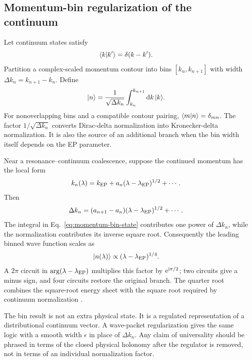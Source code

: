 \subsection{Momentum-bin regularization of the continuum}
\label{subsec:momentum-bin}

Let continuum states satisfy
\begin{equation}
  \langle k|k' \rangle=\delta(k-k') .
  \label{eq:continuum-normalization}
\end{equation}
Partition a complex-scaled momentum contour into bins
$[k_n,k_{n+1}]$ with width $\Delta k_n=k_{n+1}-k_n$.  Define
\begin{equation}
  \lvert n \rangle
  =\frac{1}{\sqrt{\Delta k_n}}
  \int_{k_n}^{k_{n+1}}\mathrm{d} k\,\lvert k \rangle .
  \label{eq:momentum-bin-state}
\end{equation}
For nonoverlapping bins and a compatible contour pairing,
$\langle m|n \rangle=\delta_{mn}$.  The factor
$1/\sqrt{\Delta k_n}$ converts Dirac-delta normalization into Kronecker-delta
normalization.  It is also the source of an additional branch when the bin
width itself depends on the EP parameter.

Near a resonance--continuum coalescence, suppose the continued momentum has
the local form
\begin{equation}
  k_n(\lambda)
  =k_{\mathrm{EP}}
  +a_n(\lambda-\lambda_{\mathrm{EP}})^{1/2}
  +\cdots .
  \label{eq:k-ep-puiseux}
\end{equation}
Then
\begin{equation}
  \Delta k_n
  =(a_{n+1}-a_n)
  (\lambda-\lambda_{\mathrm{EP}})^{1/2}
  +\cdots .
  \label{eq:bin-width-branch}
\end{equation}
The integral in Eq.~\eqref{eq:momentum-bin-state} contributes one power of
$\Delta k_n$, while the normalization contributes its inverse square root.
Consequently the leading binned wave function scales as
\begin{equation}
  \lvert n(\lambda) \rangle
  \propto(\lambda-\lambda_{\mathrm{EP}})^{1/4} .
  \label{eq:quarter-root-state}
\end{equation}
A $2\pi$ circuit in $\arg(\lambda-\lambda_{\mathrm{EP}})$ multiplies this
factor by $\mathrm{e}^{\mathrm{i}\pi/2}$; two circuits give a minus sign, and four circuits
restore the original branch.  The quarter root combines the square-root
energy sheet with the square root required by continuum normalization
\cite{Morikawa:2025inx}.

The bin result is not an extra physical state.  It is a regulated
representation of a distributional continuum vector.  A wave-packet
regularization gives the same logic with a smooth width $\epsilon$ in place of
$\Delta k_n$.  Any claim of universality should be phrased in terms of the
closed physical holonomy after the regulator is removed, not in terms of an
individual normalization factor.

